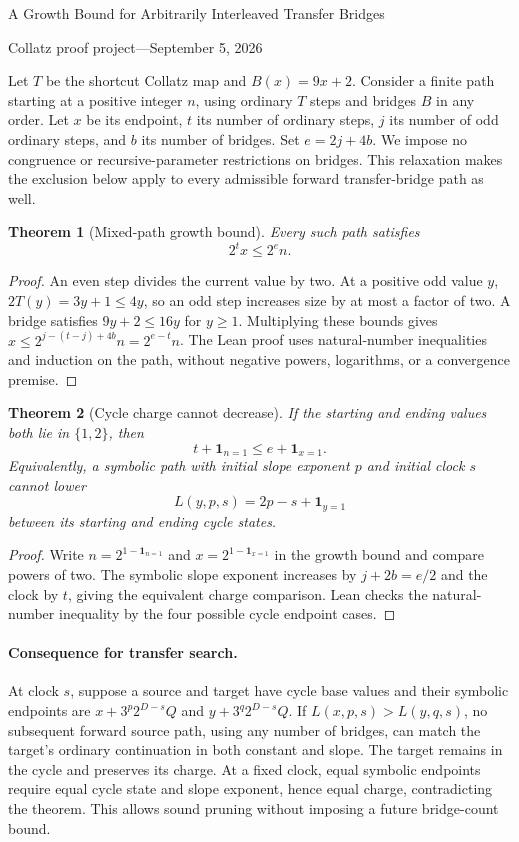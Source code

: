 \documentclass[11pt]{article}
\newtheorem{theorem}{Theorem}
\begin{document}
\begin{center}
{\Large A Growth Bound for Arbitrarily Interleaved Transfer Bridges}\par\medskip
Collatz proof project\quad---\quad September 5, 2026
\end{center}
Let $T$ be the shortcut Collatz map and $B(x)=9x+2$.
Consider a finite path starting at a positive integer $n$, using ordinary
$T$ steps and bridges $B$ in any order. Let $x$ be its endpoint, $t$ its
number of ordinary steps, $j$ its number of odd ordinary steps, and $b$
its number of bridges. Set $e=2j+4b$.
We impose no congruence or recursive-parameter restrictions on bridges.
This relaxation makes the exclusion below apply to every admissible
forward transfer-bridge path as well.

\begin{theorem}[Mixed-path growth bound]
Every such path satisfies
\[
 2^t x\leq 2^e n.
\]
\end{theorem}
\begin{proof}
An even step divides the current value by two. At a positive odd value $y$,
$2T(y)=3y+1\leq4y$, so an odd step increases size by at most a factor of two.
A bridge satisfies $9y+2\leq16y$ for $y\geq1$.
Multiplying these bounds gives
$x\leq2^{j-(t-j)+4b}n=2^{e-t}n$.
The Lean proof uses natural-number inequalities and induction on the path,
without negative powers, logarithms, or a convergence premise.
\end{proof}

\begin{theorem}[Cycle charge cannot decrease]
If the starting and ending values both lie in $\{1,2\}$, then
\[
 t+\mathbf1_{n=1}\leq e+\mathbf1_{x=1}.
\]
Equivalently, a symbolic path with initial slope exponent $p$ and initial
clock $s$ cannot lower
\[
 L(y,p,s)=2p-s+\mathbf1_{y=1}
\]
between its starting and ending cycle states.
\end{theorem}
\begin{proof}
Write $n=2^{1-\mathbf1_{n=1}}$ and
$x=2^{1-\mathbf1_{x=1}}$ in the growth bound and compare powers of two.
The symbolic slope exponent increases by $j+2b=e/2$ and the clock by $t$,
giving the equivalent charge comparison. Lean checks the natural-number
inequality by the four possible cycle endpoint cases.
\end{proof}

\paragraph{Consequence for transfer search.}
At clock $s$, suppose a source and target have cycle base values and their
symbolic endpoints are $x+3^p2^{D-s}Q$ and $y+3^q2^{D-s}Q$.
If $L(x,p,s)>L(y,q,s)$, no subsequent forward source path, using any number
of bridges, can match the target's ordinary continuation in both constant
and slope. The target remains in the cycle and preserves its charge.
At a fixed clock, equal symbolic endpoints require equal cycle state and
slope exponent, hence equal charge, contradicting the theorem.
This allows sound pruning without imposing a future bridge-count bound.
\end{document}
